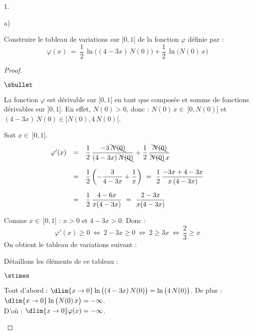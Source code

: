 \documentclass[11pt]{article}%
\begin{document}
\begin{noliste}{1.}
\begin{noliste}{a)}
    
    \newpage

    
    \item Construire le tableau de variations sur $]0,1]$ de la 
    fonction $\varphi$ définie par :
    \[
      \varphi(x) \ = \ \dfrac{1}{2} \, \ln\big((4-3x) \, N(0)\big) 
      + \dfrac{1}{2} \, \ln\big(N(0) \, x\big)
    \]
    
    \begin{proof}~
      \begin{noliste}{$\sbullet$}
	\item La fonction $\varphi$ est dérivable sur $]0,1]$ en tant 
	que composée et somme de fonctions dérivables sur $]0,1]$. 
	En effet, $N(0) >0$, donc : $N(0) \, x \in \ ]0,N(0)]$ et 
	$(4-3x) \, N(0) \in [N(0), 4 \, N(0)[$.

	
	\item Soit $x \in \ ]0,1]$.
	\[
	  \begin{array}{rcl}
	    \varphi'(x) &=& \dfrac{1}{2} \, \dfrac{-3 \, \bcancel{N(0)}}
	    {(4-3x) \, \bcancel{N(0)}} + \dfrac{1}{2} \, 
	    \dfrac{\bcancel{N(0)}}{\bcancel{N(0)} \, x}
	    \\[.6cm]
	    &=& \dfrac{1}{2} \left( - \dfrac{3}{4-3x} + \dfrac{1}{x}
	    \right) \ = \ \dfrac{1}{2} \, \dfrac{-3x+4-3x}{x \, 
	    (4-3x)}
	    \\[.6cm]
	    &=& \dfrac{1}{2} \, \dfrac{4-6x}{x(4-3x)} \ = \ 
	    \dfrac{2-3x}{x(4-3x)}
	  \end{array}
	\]
	
	\item Comme $x \in \ ]0,1]$ : $x >0$ et $4-3x>0$. Donc :
	\[
	  \varphi'(x) \geq 0 \ \Leftrightarrow \ 2-3x \geq 0 \
	  \Leftrightarrow \ 2 \geq 3x \ \Leftrightarrow \ 
	  \dfrac{2}{3} \geq x
	\]
	On obtient le tableau de variations suivant :
	\begin{center}
      \end{center}
      
      Détaillons les éléments de ce tableau :
      \begin{noliste}{$\stimes$}
	\item Tout d'abord : $\dlim{x\to 0} \ln \big( (4-3x) \, N(0)
	\big) = \ln\big(4 \, N(0)\big)$. De plus : $\dlim{x\to 0}
	\ln\big( N(0) \, x \big) = -\infty$.\\[.1cm]
	D'où : $\dlim{x\to 0} \varphi(x)=-\infty$.
	

\end{noliste}
\end{noliste}
\end{proof}
\end{noliste}
\end{noliste}
\end{document}
